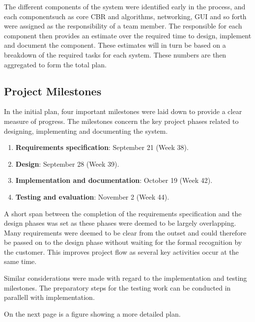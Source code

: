 The different components of the system were identified early in the process, and each componentsuch as core CBR and algorithms, networking, GUI and so forth were assigned as the responsibility of a team member. The responsible for each component then provides an estimate over the required time to design, implement and document the component. These estimates will in turn be based on a breakdown of the required tasks for each system. These numbers are then aggregated to form the total plan.

\subsection{Project Milestones}

In the initial plan, four important milestones were laid down to provide a clear measure of progress. The milestones concern the key project phases related to designing, implementing and documenting the system.

\begin{enumerate}
\item \textbf{Requirements specification}: September 21 (Week 38).
\item \textbf{Design}: September 28 (Week 39).
\item \textbf{Implementation and documentation}: October 19 (Week 42).
\item \textbf{Testing and evaluation}: November 2 (Week 44).
\end{enumerate}

A short span between the completion of the requirements specification and the design phases was set as these phases were deemed to be largely overlapping. Many requirements were deemed to be clear from the outset and could therefore be passed on to the design phase without waiting for the formal recognition by the customer. This improves project flow as several key activities occur at the same time.

Similar considerations were made with regard to the implementation and testing milestones. The preparatory steps for the testing work can be conducted in parallell with implementation.

On the next page is a figure showing a more detailed plan.

